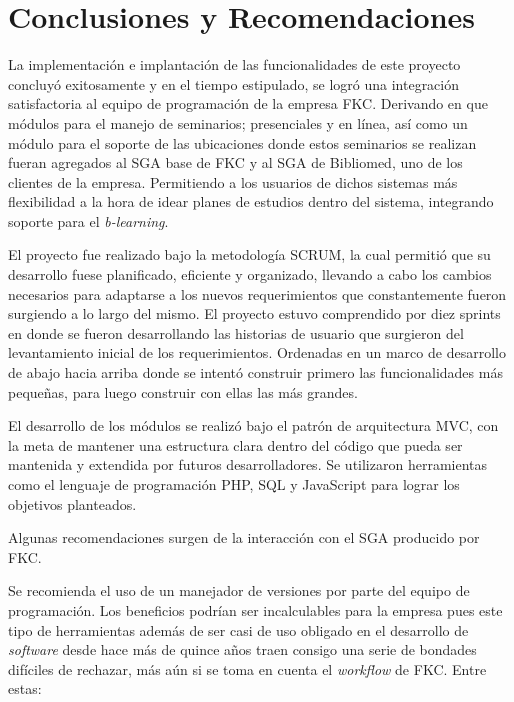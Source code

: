 \chapter*{Conclusiones y Recomendaciones}
\thispagestyle{empty} %
 

La implementación e implantación de las funcionalidades de este proyecto concluyó exitosamente y en el tiempo estipulado, se logró una integración satisfactoria al equipo de programación de la empresa \gls{FKC}. Derivando en que módulos para el manejo de seminarios; presenciales y en línea, así como un módulo para el soporte de las ubicaciones donde estos seminarios se realizan fueran agregados al \gls{SGA} base de FKC y al \gls{SGA} de Bibliomed, uno de los clientes de la empresa. Permitiendo a los usuarios de dichos sistemas más flexibilidad a la hora de idear planes de estudios dentro del sistema, integrando soporte para el \emph{b-learning}.

El proyecto fue realizado bajo la metodología SCRUM, la cual permitió que su desarrollo fuese planificado, eficiente y organizado, llevando a cabo los cambios necesarios para adaptarse a los nuevos requerimientos que constantemente fueron surgiendo a lo largo del mismo. El proyecto estuvo comprendido por diez sprints en donde se fueron desarrollando las historias de usuario que surgieron del levantamiento inicial de los requerimientos. Ordenadas en un marco de desarrollo de abajo hacia arriba donde se intentó construir primero las funcionalidades más pequeñas, para luego construir con ellas las más grandes.

El desarrollo de los módulos se realizó bajo el patrón de arquitectura \gls{MVC}, con la meta de mantener una estructura clara dentro del código que pueda ser mantenida y extendida por futuros desarrolladores. Se utilizaron herramientas como el lenguaje de programación \gls{PHP}, \gls{SQL} y JavaScript para lograr los objetivos planteados.

Algunas recomendaciones surgen de la interacción con el \gls{SGA} producido por \gls{FKC}.

Se recomienda el uso de un manejador de versiones por parte del equipo de programación. Los beneficios podrían ser incalculables para la empresa pues este tipo de herramientas además de ser casi de uso obligado en el desarrollo de \emph{software} desde hace más de quince años traen consigo una serie de bondades difíciles de rechazar, más aún si se toma en cuenta el \emph{workflow} de FKC. Entre estas:

